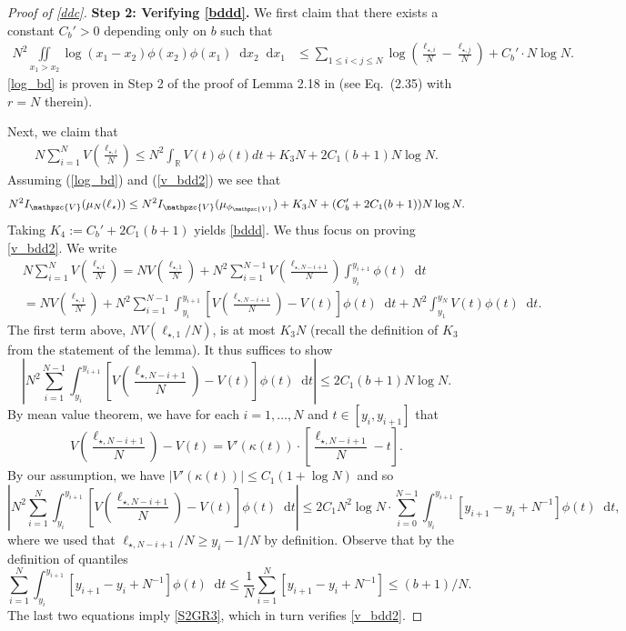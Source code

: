 \documentclass[reqno,11pt]{amsart}
\renewcommand{\d}{\diff}
\numberwithin{equation}{section}
\theoremstyle{definition}
\newcommand*\diff{\mathop{}\!\mathrm{d}}
\begin{document}
\begin{proof}[Proof of \ref{ddc}]
\medskip
	
\noindent\textbf{Step 2: Verifying \eqref{bddd}.} We first claim that there exists a constant $C_b'>0$ depending only on $b$ such that
\begin{align}\label{log_bd}
N^2\iint\limits_{x_1>x_2}\log(x_1-x_2)\phi(x_2)\phi(x_1)\d x_2 \d x_1 & \le \sum_{1 \leq i < j \leq N}\log\left(\frac{\ell_{\star,i}}{N}-\frac{\ell_{\star,j}}{N}\right)+C_b' \cdot N\log N.
\end{align}
\eqref{log_bd} is proven in Step 2 of the proof of Lemma 2.18 in \cite{das2022large} (see Eq.~(2.35) with $r=N$ therein).

Next, we claim that
\begin{align}\label{v_bdd2}
N\sum_{i=1}^N V\left(\frac{\ell_{\star,i}}{N}\right) \le N^2\int_{\mathbb{R}} V(t)\phi(t)dt + K_3N + 2C_1(b+1)N\log N.
\end{align}
Assuming (\ref{log_bd}) and (\ref{v_bdd2}) we see that 
$$ N^2I_{\mathpzc{V}}(\mu_{N}(\ell_\star)) \leq N^2 I_{\mathpzc{V}}(\mu_{\phi_{\mathpzc{V}}}) + K_3N+(C_b'+2C_1(b+1))N\log N.$$
Taking $K_4:=C_b'+2C_1(b+1)$ yields \eqref{bddd}. We thus focus on proving \eqref{v_bdd2}. We write
\begin{equation}\label{S2GR1}
\begin{split}
&N\sum_{i=1}^N V\left(\frac{\ell_{\star,i}}{N}\right)  = NV\left(\frac{\ell_{\star,1}}{N}\right) +  N^2\sum_{i=1}^{N-1}V\left(\frac{\ell_{\star, N-i + 1}}{N}\right)\int_{y_{i}}^{y_{i+1}} \phi(t)\d t    \\ 
& = NV\left(\frac{\ell_{\star,1}}{N}\right)+N^2\sum_{i=1}^{N-1} \int_{y_{i}}^{y_{i+1}}  \left[ V\left(\frac{\ell_{\star, N-i + 1}}{N}\right) - V(t)\right]\phi(t)\d t + N^2\int_{y_1}^{y_N} V(t) \phi(t) \d t. 
\end{split}
\end{equation}
The first term above, $NV({\ell_{\star,1}}/{N})$, is at most $K_3 N$ (recall the definition of $K_3$ from the statement of the lemma). It thus suffices to show 
\begin{equation}\label{S2GR3}
\left|N^2\sum_{i=1}^{N-1} \int_{y_{i}}^{y_{i+1}}  \left[ V\left(\frac{\ell_{\star,N-i + 1}}{N}\right) - V(t)\right]\phi(t)\d t\right| \le  2C_1(b+1)N \log N.
\end{equation}
By mean value theorem, we have for each $i = 1, \dots, N$ and $t \in [y_i, y_{i+1}]$ that
$$  V\left(\frac{\ell_{\star,N-i + 1}}{N}\right) - V(t) = V'( \kappa(t)) \cdot \left[  \frac{\ell_{\star,N-i + 1}}{N} -t\right].$$
By our assumption, we have $|V'( \kappa(t))| \le C_1(1+\log N)$ and so
$$\left|N^2\sum_{i=1}^{N} \int_{y_{i}}^{y_{i+1}}  \left[ V\left(\frac{\ell_{\star, N-i + 1}}{N}\right) - V(t)\right]\phi(t)\d t\right|  \le 2C_1N^2 \log N \cdot \sum_{i=0}^{N-1} \int_{y_{i}}^{y_{i+1}}  \left[y_{i+1} - y_i + N^{-1}\right]\phi(t)\d t,$$
where we used that $\ell_{\star,N-i + 1}/N \geq y_i - 1/N$ by definition. Observe that by the definition of quantiles
$$ \sum_{i=1}^{N} \int_{y_{i}}^{y_{i+1}}  \left[y_{i+1} - y_i + N^{-1}\right]\phi(t)\d t \le \frac{1}{N} \sum_{i=1}^{N} \left[y_{i+1} - y_i + N^{-1}\right] \le (b+1)/N.$$
The last two equations imply \eqref{S2GR3}, which in turn verifies \eqref{v_bdd2}.
\end{proof}
\end{document}
